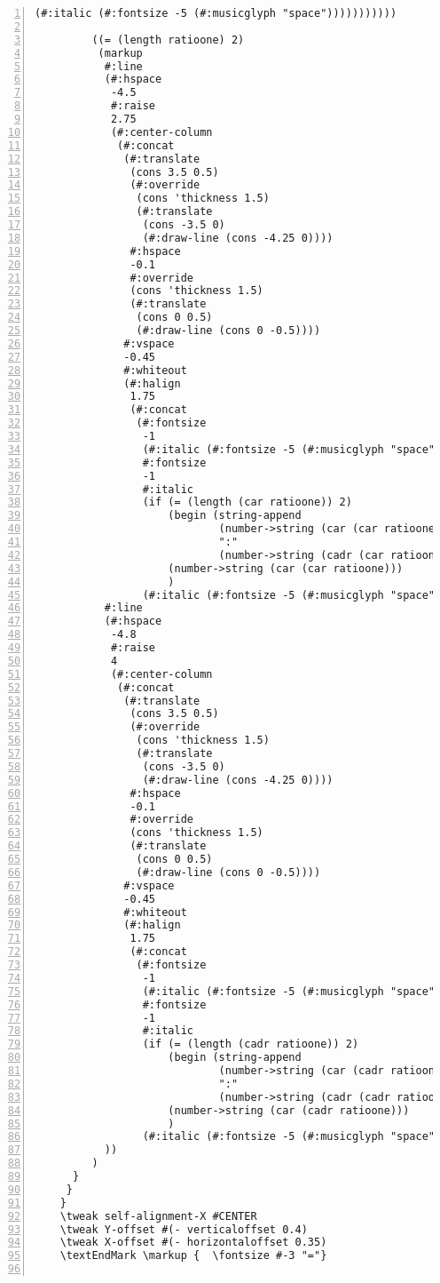 \begin{Verbatim}[numbers=left,xleftmargin=5mm]
                 (#:italic (#:fontsize -5 (#:musicglyph "space")))))))))))

         ((= (length ratioone) 2)
          (markup
           #:line
           (#:hspace
            -4.5
            #:raise
            2.75
            (#:center-column
             (#:concat
              (#:translate
               (cons 3.5 0.5)
               (#:override
                (cons 'thickness 1.5)
                (#:translate
                 (cons -3.5 0)
                 (#:draw-line (cons -4.25 0))))
               #:hspace
               -0.1
               #:override
               (cons 'thickness 1.5)
               (#:translate
                (cons 0 0.5)
                (#:draw-line (cons 0 -0.5))))
              #:vspace
              -0.45
              #:whiteout
              (#:halign
               1.75
               (#:concat
                (#:fontsize
                 -1
                 (#:italic (#:fontsize -5 (#:musicglyph "space")))
                 #:fontsize
                 -1
                 #:italic
                 (if (= (length (car ratioone)) 2)
                     (begin (string-append
                             (number->string (car (car ratioone)))
                             ":"
                             (number->string (cadr (car ratioone))))  )
                     (number->string (car (car ratioone)))
                     )
                 (#:italic (#:fontsize -5 (#:musicglyph "space")))))))))
           #:line
           (#:hspace
            -4.8
            #:raise
            4
            (#:center-column
             (#:concat
              (#:translate
               (cons 3.5 0.5)
               (#:override
                (cons 'thickness 1.5)
                (#:translate
                 (cons -3.5 0)
                 (#:draw-line (cons -4.25 0))))
               #:hspace
               -0.1
               #:override
               (cons 'thickness 1.5)
               (#:translate
                (cons 0 0.5)
                (#:draw-line (cons 0 -0.5))))
              #:vspace
              -0.45
              #:whiteout
              (#:halign
               1.75
               (#:concat
                (#:fontsize
                 -1
                 (#:italic (#:fontsize -5 (#:musicglyph "space")))
                 #:fontsize
                 -1
                 #:italic
                 (if (= (length (cadr ratioone)) 2)
                     (begin (string-append
                             (number->string (car (cadr ratioone)))
                             ":"
                             (number->string (cadr (cadr ratioone))))  )
                     (number->string (car (cadr ratioone)))
                     )
                 (#:italic (#:fontsize -5 (#:musicglyph "space")))))))))
           ))
         )
      }
     }
    }
    \tweak self-alignment-X #CENTER
    \tweak Y-offset #(- verticaloffset 0.4)
    \tweak X-offset #(- horizontaloffset 0.35)
    \textEndMark \markup {  \fontsize #-3 "="}


\end{Verbatim}
